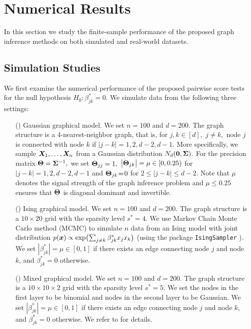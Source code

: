 \documentclass[twoside,11pt]{article}
\newcommand{\rmnum}[1]{\romannumeral #1}
\begin{document}
\section{Numerical Results}\label{sec::simulations}
In this section we study the finite-sample performance of the proposed graph inference methods  on both simulated and real-world datasets. %

\subsection{Simulation Studies}

We first examine the numerical performance of the proposed pairwise score tests for the null hypothesis $H_0\colon \beta_{jk}^* = 0.$ We simulate data from the following three settings: 
\begin{enumerate}
\item[(\rmnum{1})]Gaussian graphical model. We set $n=100$ and  $d=200.$ The graph structure is a $4$-nearest-neighbor graph, that is, for $j,k\!\in[d],$ $j\!\neq\! k,$ node $j$ is connected with node $k$ if $|j-k| = 1,2,d-2,d-1.$    More specifically, we sample $\bm{X}_1,\ldots, \bm{X}_n $  from a Gaussian distribution $N_d({\bf 0}, \bm{\Sigma}).$ For the precision matrix $\bm{\Theta} = \bm{\Sigma}^{-1},$ we set $\bm{\Theta}_{jj} = 1,$ $\bigl| \bm{\Theta}_{jk}\bigr| = \mu\in [0,0.25)$ for $|j-k|=1,2,d\!-\!2,d\!-\!1$ and $\bm{\Theta}_{jk}\! =\! 0$ for $2\!\leq\! |j-k| \!\!\leq\! d-2.$ Note that $\mu$ denotes the signal strength of the graph inference problem and $\mu\leq 0.25$ ensures that $\bm{\Theta}$ is diagonal dominant and invertible.
\item[(\rmnum{2})] Ising graphical model. We set $n=100$ and $d=200.$ The graph structure is a $10\!\times\! 20$ grid with  the sparsity level  $s^* = 4.$  We use Markov Chain Monte Carlo method (MCMC) to simulate $n$ data from an Ising model with joint distribution $p(\bm{x}) \propto \exp\bigl( \sum_{j\neq k} \beta_{jk}^* x_j x_k\bigr)$ (using the package \texttt{IsingSampler} \citep{isingsampler}).  We set $|\beta_{jk}^* | = \mu\in [0,1]$ if there exists an edge connecting node $j$  and node $k$, and $\beta_{jk}^* = 0$ otherwise. 
\item [(\rmnum{3})]Mixed graphical model. We set $n=100$ and $d=200.$ The graph structure is a $10\!\times\! 10\!\times\! 2$ grid with the sparsity level $s^* = 5$. We set the nodes in the first layer to be binomial and nodes in the second layer to be Gaussian.  We set $|\beta_{jk}^* | = \mu \in[0,1]$ if there exists an edge connecting node $j$  and node $k$, and $\beta_{jk}^* = 0$ otherwise. We refer to \cite{lee2013structure} for details. 
\end{enumerate}
\end{document}
